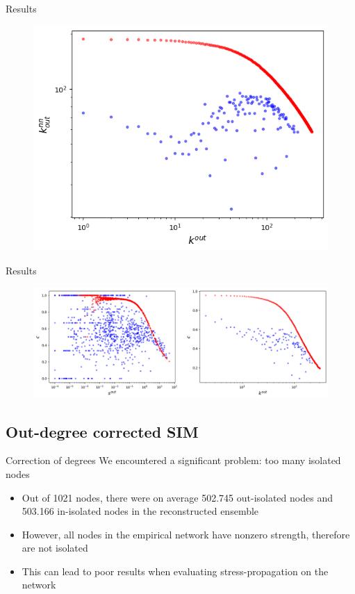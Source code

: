 \documentclass{beamer}
\begin{document}
\begin{frame}{Results}
    \begin{figure}[!ht]
    \centering
    \includegraphics[scale=0.35]{img/Vanilla_SIM/ANND_k.png}
\end{figure}
\end{frame}

\begin{frame}{Results}
    \begin{figure}[!ht]
    \centering
    \includegraphics[scale=0.35]{img/Vanilla_SIM/cl_coeff.png}
\end{figure}
\end{frame}

\subsection{Out-degree corrected SIM}
\begin{frame}{Correction of degrees}
  We encountered a significant problem: too many isolated nodes
\begin{itemize}
    \item Out of 1021 nodes, there were on average 502.745 out-isolated nodes and 503.166 in-isolated nodes in the reconstructed ensemble
    \item However, all nodes in the empirical network have nonzero strength, therefore are not isolated
    \item This can lead to poor results when evaluating stress-propagation on the network
\end{itemize}  
\end{frame}
\end{document}
